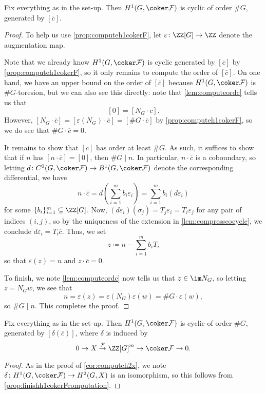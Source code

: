 \documentclass{article}
\numberwithin{equation}{section}
\begin{document}
\begin{prop} \label{prop:finishh1cokerFcomputation}
	Fix everything as in the set-up. Then $H^1(G,\coker\mathcal F)$ is cyclic of order $\#G$, generated by $[\overline c]$.
\end{prop}
\begin{proof}
	To help us use \autoref{prop:computeh1cokerF}, let $\varepsilon\colon\ZZ[G]\to\ZZ$ denote the augmentation map.
	
	Note that we already know $H^1(G,\coker\mathcal F)$ is cyclic generated by $[\overline c]$ by \autoref{prop:computeh1cokerF}, so it only remains to compute the order of $[\overline c]$. On one hand, we have an upper bound on the order of $[\overline c]$ because $H^1(G,\coker\mathcal F)$ is $\#G$-toresion, but we can also see this directly: note that \autoref{lem:computeordc} tells us that
	\[[0]=[N_G\cdot\overline c].\]
	However, $[N_G\cdot\overline c]=[\varepsilon(N_G)\cdot\overline c]=[\#G\cdot\overline c]$ by \autoref{prop:computeh1cokerF}, so we do see that $\#G\cdot\overline c=0$.
	
	It remains to show that $[\overline c]$ has order at least $\#G$. As such, it suffices to show that if $n$ has $[n\cdot\overline c]=[0]$, then $\#G\mid n$. In particular, $n\cdot\overline c$ is a coboundary, so letting $d\colon C^0(G,\coker\mathcal F)\to B^1(G,\coker\mathcal F)$ denote the corresponding differential, we have
	\[n\cdot\overline c=d\left(\sum_{i=1}^mb_i\varepsilon_i\right)=\sum_{i=1}^mb_i(d\varepsilon_i)\]
	for some $\{b_i\}_{i=1}^m\subseteq\ZZ[G]$. Now, $(d\varepsilon_i)(\sigma_j)=T_j\varepsilon_i=T_i\varepsilon_j$ for any pair of indices $(i,j)$, so by the uniqueness of the extension in \autoref{lem:compresscocycle}, we conclude $d\varepsilon_i=T_i\overline c$. Thus, we set
	\[z\coloneqq n-\sum_{i=1}^mb_iT_i\]
	so that $\varepsilon(z)=n$ and $z\cdot\overline c=0$.

	To finish, we note \autoref{lem:computeordc} now tells us that $z\in\im N_G$, so letting $z=N_Gw$, we see that
	\[n=\varepsilon(z)=\varepsilon(N_G)\varepsilon(w)=\#G\cdot\varepsilon(w),\]
	so $\#G\mid n$. This completes the proof.
\end{proof}
\begin{cor}
	Fix everything as in the set-up. Then $H^1(G,\coker\mathcal F)$ is cyclic of order $\#G$, generated by $[\delta(\overline c)]$, where $\delta$ is induced by
	\[0\to X\stackrel{\mathcal F}\to\ZZ[G]^m\to\coker\mathcal F\to0.\]
\end{cor}
\begin{proof}
	As in the proof of \autoref{cor:computeh2x}, we note $\delta\colon H^1(G,\coker\mathcal F)\to H^2(G,X)$ is an isomorphism, so this follows from \autoref{prop:finishh1cokerFcomputation}.
\end{proof}
\end{document}
